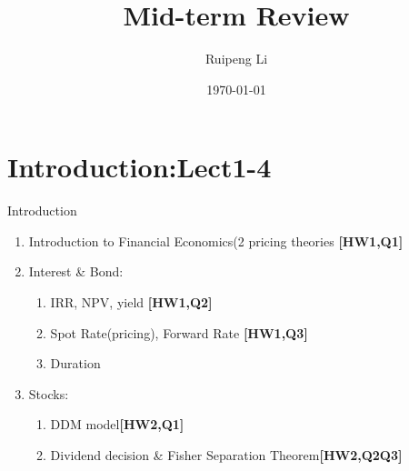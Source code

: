 \documentclass{beamer}
\title{Mid-term Review}
\author{Ruipeng Li}
\institute{Peking University}
\date{\today}
\begin{document}
\frame{
	\titlepage
	}

	
 \section{Introduction:Lect1-4}
  \label{sec:Intro}

 \begin{frame}{Introduction}
    \begin{enumerate}
		\item Introduction to Financial Economics(2 pricing theories \textbf{[HW1,Q1]}
		\item Interest \& Bond:
			\begin{enumerate}
				\item IRR, NPV, yield \textbf{[HW1,Q2]}
				\item Spot Rate(pricing), Forward Rate \textbf{[HW1,Q3]}
				\item Duration
			\end{enumerate} 
		\item Stocks:
			\begin{enumerate}
				\item DDM model\textbf{[HW2,Q1]}
				\item Dividend decision \& Fisher Separation Theorem\textbf{[HW2,Q2Q3]}
			\end{enumerate}
    \end{enumerate}
 \end{frame}
	
\end{document}
